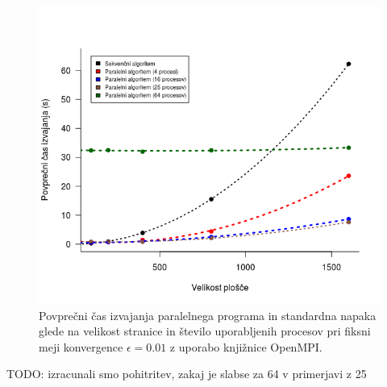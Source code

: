 \documentclass[a4paper,titlepage,11pt]{article}
\begin{document}
\begin{figure}[H]
\begin{center}
\includegraphics[scale=0.6]{graf-rezultati-5_1.png}
\caption{Povprečni čas izvajanja paralelnega programa in standardna napaka glede na velikost stranice in število uporabljenih procesov pri fiksni meji konvergence $\epsilon = 0.01$ z uporabo knjižnice OpenMPI.}
\label{graf-rezultati-5}
\end{center}
\vspace{-25pt}
\end{figure}

TODO: izracunali smo pohitritev, zakaj je slabse za 64 v primerjavi z 25
\end{document}
